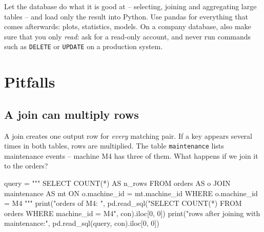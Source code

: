 \documentclass[
  letterpaper,
  DIV=11,
  numbers=noendperiod]{scrreprt}
\newenvironment{Shaded}{\begin{snugshade}}{\end{snugshade}}
\newcommand{\BuiltInTok}[1]{\textcolor[rgb]{0.00,0.23,0.31}{#1}}
\newcommand{\DecValTok}[1]{\textcolor[rgb]{0.68,0.00,0.00}{#1}}
\newcommand{\NormalTok}[1]{\textcolor[rgb]{0.00,0.23,0.31}{#1}}
\newcommand{\OperatorTok}[1]{\textcolor[rgb]{0.37,0.37,0.37}{#1}}
\newcommand{\StringTok}[1]{\textcolor[rgb]{0.13,0.47,0.30}{#1}}
\begin{document}
\begin{tcolorbox}[enhanced jigsaw, left=2mm, title=\textcolor{quarto-callout-tip-color}{\faLightbulb}\hspace{0.5em}{Engineering practice: filter and aggregate in the database}, opacityback=0, breakable, rightrule=.15mm, arc=.35mm, toptitle=1mm, colbacktitle=quarto-callout-tip-color!10!white, opacitybacktitle=0.6, coltitle=black, colframe=quarto-callout-tip-color-frame, bottomrule=.15mm, leftrule=.75mm, bottomtitle=1mm, titlerule=0mm, toprule=.15mm, colback=white]

Let the database do what it is good at -- selecting, joining and
aggregating large tables -- and load only the result into Python. Use
pandas for everything that comes afterwards: plots, statistics, models.
On a company database, also make sure that you only \emph{read}: ask for
a read-only account, and never run commands such as \texttt{DELETE} or
\texttt{UPDATE} on a production system.

\end{tcolorbox}

\section{Pitfalls}\label{pitfalls-1}

\subsection{A join can multiply rows}\label{a-join-can-multiply-rows}

A join creates one output row for \emph{every} matching pair. If a key
appears several times in both tables, rows are multiplied. The table
\texttt{maintenance} lists maintenance events -- machine M4 has three of
them. What happens if we join it to the orders?

\begin{Shaded}
\begin{Highlighting}[]
\NormalTok{query }\OperatorTok{=} \StringTok{"""}
\StringTok{SELECT COUNT(*) AS n\_rows}
\StringTok{FROM orders AS o}
\StringTok{JOIN maintenance AS mt ON o.machine\_id = mt.machine\_id}
\StringTok{WHERE o.machine\_id = \textquotesingle{}M4\textquotesingle{}}
\StringTok{"""}
\BuiltInTok{print}\NormalTok{(}\StringTok{"orders of M4:            "}\NormalTok{, pd.read\_sql(}\StringTok{"SELECT COUNT(*) FROM orders WHERE machine\_id = \textquotesingle{}M4\textquotesingle{}"}\NormalTok{, con).iloc[}\DecValTok{0}\NormalTok{, }\DecValTok{0}\NormalTok{])}
\BuiltInTok{print}\NormalTok{(}\StringTok{"rows after joining with maintenance:"}\NormalTok{, pd.read\_sql(query, con).iloc[}\DecValTok{0}\NormalTok{, }\DecValTok{0}\NormalTok{])}
\end{Highlighting}
\end{Shaded}
\end{document}
